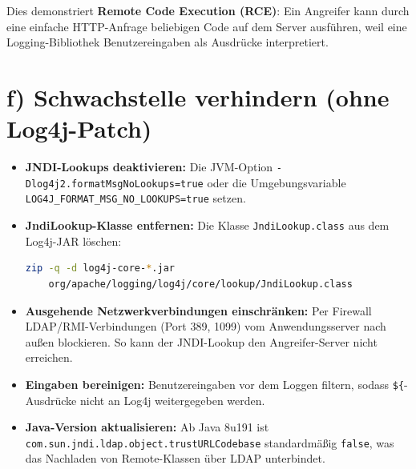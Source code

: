 \documentclass[
	fontsize=12pt,
	paper=a4,
	numbers=noenddot,
	listof=totoc,
	listof=entryprefix,
	listof=nochaptergap,
	bibliography=totoc,
	parskip=half,
	openany
]{scrbook}
\begin{document}
Dies demonstriert \textbf{Remote Code Execution (RCE)}: Ein Angreifer kann durch eine einfache HTTP-Anfrage beliebigen Code auf dem Server ausführen, weil eine Logging-Bibliothek Benutzereingaben als Ausdrücke interpretiert.

\section*{f) Schwachstelle verhindern (ohne Log4j-Patch)}

\begin{itemize}
	\item \textbf{JNDI-Lookups deaktivieren:} Die JVM-Option \texttt{-Dlog4j2.formatMsgNoLookups=true} oder die Umgebungsvariable \texttt{LOG4J\_FORMAT\_MSG\_NO\_LOOKUPS=true} setzen.
	\item \textbf{JndiLookup-Klasse entfernen:} Die Klasse \texttt{JndiLookup.class} aus dem Log4j-JAR löschen:
	      \begin{lstlisting}[language=bash]
zip -q -d log4j-core-*.jar
    org/apache/logging/log4j/core/lookup/JndiLookup.class
	      \end{lstlisting}
	\item \textbf{Ausgehende Netzwerkverbindungen einschränken:} Per Firewall LDAP/RMI-Verbindungen (Port 389, 1099) vom Anwendungsserver nach außen blockieren.
	      So kann der JNDI-Lookup den Angreifer-Server nicht erreichen.
	\item \textbf{Eingaben bereinigen:} Benutzereingaben vor dem Loggen filtern, sodass \texttt{\$\{}-Ausdrücke nicht an Log4j weitergegeben werden.
	\item \textbf{Java-Version aktualisieren:} Ab Java 8u191 ist \texttt{com.sun.jndi.ldap.object.trustURLCodebase} standardmäßig \texttt{false}, was das Nachladen von Remote-Klassen über LDAP unterbindet.
\end{itemize}

\end{document}
